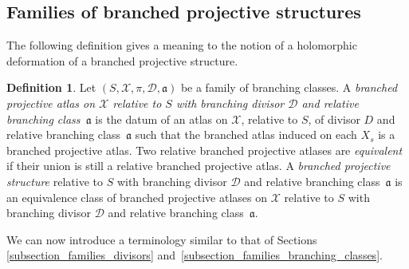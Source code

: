 \documentclass[JEP,XML,SOM,Unicode,NoEqCountersInSection,published]{cedram}
\theoremstyle{definition}
\newtheorem{definition}{Definition}[subsection]
\theoremstyle{plain}
\begin{document}
\subsection{Families of branched projective structures}\label{subsection_families_bps}

The following definition gives a meaning to the notion of a holomorphic deformation of a branched projective structure.

\begin{definition}\label{definition_relative_bps}
Let $(S, \mathcal X, \pi, \mathcal D, \mathfrak a)$ be a family of branching classes.
A \emph{branched projective atlas on $\mathcal X$ relative to $S$ with branching divisor $\mathcal D$ and relative branching class~$\mathfrak a$} is the datum of an atlas on $\mathcal X$, relative to $S$, of divisor $D$ and relative branching class~$\mathfrak a$ such that the branched atlas induced on each $X_s$ is a branched projective atlas.
Two relative branched projective atlases are \emph{equivalent} if their union is still a relative branched projective atlas.
A \emph{branched projective structure} relative to $S$ with branching divisor $\mathcal D$ and relative branching class~$\mathfrak a$ is an equivalence class of branched projective atlases on $\mathcal X$ relative to $S$ with branching divisor $\mathcal D$ and relative branching class~$\mathfrak a$.
\end{definition}

We can now introduce a terminology similar to that of Sections \ref{subsection_families_divisors} and~\ref{subsection_families_branching_classes}.
\end{document}
